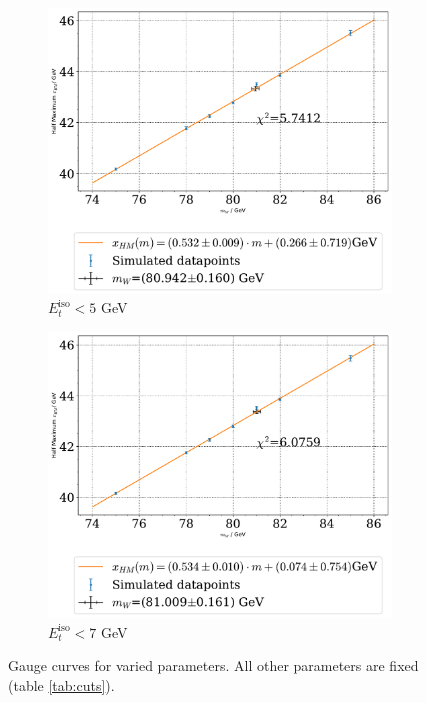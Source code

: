 \documentclass[11pt,a4paper,notitlepage]{scrartcl}
\begin{document}
\begin{figure}[H]
	\begin{subfigure}{0.49\linewidth}
		\includegraphics[width=\linewidth]{P1_pics/gauge_results/gauge_el_etiso_ll.pdf}
		\caption{$E_t^\text{iso}<5$ GeV}
	\end{subfigure}
	\begin{subfigure}{0.49\linewidth}
		\includegraphics[width=\linewidth]{P1_pics/gauge_results/gauge_el_etiso_ul.pdf}
		\caption{$E_t^\text{iso}<7$ GeV}
	\end{subfigure}
	\caption{Gauge curves for varied parameters. All other parameters are fixed (table \ref{tab:cuts}).}
\end{figure}
\end{document}
